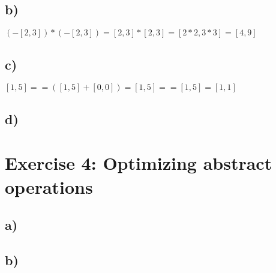\documentclass[11pt,a4paper]{scrartcl}
\begin{document}
\subsection*{b)}
$(-[2,3]) * (-[2,3]) = [2,3] * [2,3] = [2*2, 3*3] = [4,9]$

\subsection*{c)}
$[1,5] == ([1,5] + [0,0]) = [1,5] == [1,5] = [1,1]$

\subsection*{d)}


\section*{Exercise 4: Optimizing abstract operations}
\subsection*{a)}

\subsection*{b)}
\end{document}
